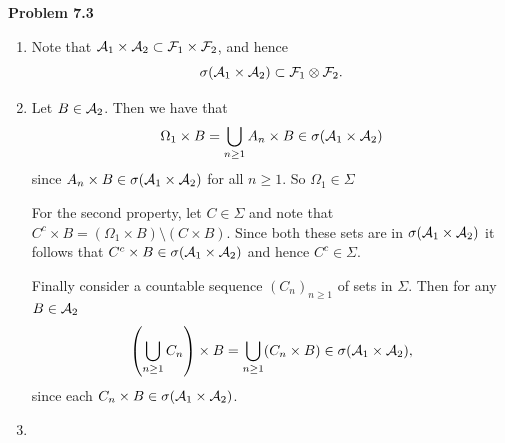 \textbf{Problem 7.3} 
\begin{enumerate}[label={(\alph*)}]
\item {}
Note that $\mathcal A_1 \times \mathcal A_2 \subset \mathcal F_1 \times \mathcal F_2$, and hence
\[
	\sigma(\mathcal A_1 \times \mathcal A_2) \subset \mathcal F_1 \otimes \mathcal F_2.
\]
\item {}
Let $B \in \mathcal A_2$. Then we have that
\[
	\Omega_1 \times B = \bigcup_{n \ge 1} A_n \times B \in \sigma(\mathcal A_1 \times \mathcal A_2) 
\]
since $A_n \times B \in \sigma(\mathcal A_1 \times \mathcal A_2)$ for all $n \ge 1$. So $\Omega_1 \in \Sigma$

For the second property, let $C \in \Sigma$ and note that $C^c \times B = (\Omega_1 \times B) \setminus (C \times B)$.
Since both these sets are in $\sigma(\mathcal A_1 \times \mathcal A_2)$ it follows that $C^c \times B \in \sigma(\mathcal A_1 \times \mathcal A_2)$ and hence $C^c \in \Sigma$.

Finally consider a countable sequence $(C_n)_{n \ge 1}$ of sets in $\Sigma$. Then for any $B \in \mathcal A_2$
\[
	\left(\bigcup_{n \ge 1} C_n \right) \times B = \bigcup_{n \ge 1} (C_n \times B) \in \sigma(\mathcal A_1 \times \mathcal A_2),
\]
since each $C_n \times B \in \sigma(\mathcal A_1 \times \mathcal A_2)$.
\item {}


\end{enumerate}
